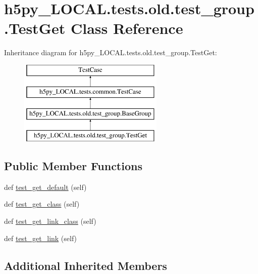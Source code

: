 \hypertarget{classh5py__LOCAL_1_1tests_1_1old_1_1test__group_1_1TestGet}{}\section{h5py\+\_\+\+L\+O\+C\+A\+L.\+tests.\+old.\+test\+\_\+group.\+Test\+Get Class Reference}
\label{classh5py__LOCAL_1_1tests_1_1old_1_1test__group_1_1TestGet}
Inheritance diagram for h5py\+\_\+\+L\+O\+C\+A\+L.\+tests.\+old.\+test\+\_\+group.\+Test\+Get\+:\begin{figure}[H]
\begin{center}
\leavevmode
\includegraphics[height=4.000000cm]{classh5py__LOCAL_1_1tests_1_1old_1_1test__group_1_1TestGet}
\end{center}
\end{figure}
\subsection*{Public Member Functions}
\begin{DoxyCompactItemize}
\item 
def \hyperlink{classh5py__LOCAL_1_1tests_1_1old_1_1test__group_1_1TestGet_a9f2899ccdbf445c090cb51644c59dedd}{test\+\_\+get\+\_\+default} (self)
\item 
def \hyperlink{classh5py__LOCAL_1_1tests_1_1old_1_1test__group_1_1TestGet_a97bb890f38af92cfc632b208366ef30c}{test\+\_\+get\+\_\+class} (self)
\item 
def \hyperlink{classh5py__LOCAL_1_1tests_1_1old_1_1test__group_1_1TestGet_a0a12e0cfb88bceb01624df61789dbb37}{test\+\_\+get\+\_\+link\+\_\+class} (self)
\item 
def \hyperlink{classh5py__LOCAL_1_1tests_1_1old_1_1test__group_1_1TestGet_a999037188da5eae87af10fdee780043a}{test\+\_\+get\+\_\+link} (self)
\end{DoxyCompactItemize}
\subsection*{Additional Inherited Members}


